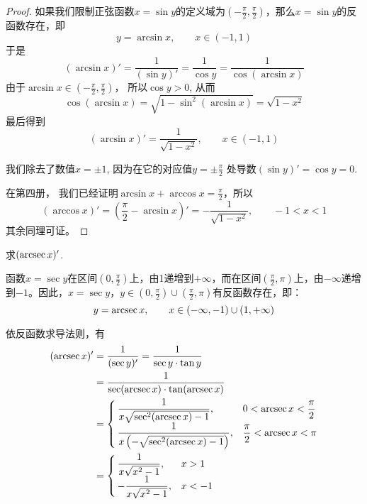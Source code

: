 \begin{proof}
如果我们限制正弦函数$x=\sin y$的定义域为$\left(-\frac{\pi}{2},\frac{\pi}{2}\right)$，那么$x=\sin y$的反函数存在，即
\[    y=\arcsin x,\qquad x\in (-1, 1)\]
于是
\[    (\arcsin x)'=\frac{1}{(\sin y)'}=\frac{1}{\cos y}=\frac{1}{\cos(\arcsin x)}\]
由于$\arcsin x\in \left(-\frac{\pi}{2},\frac{\pi}{2}\right)$，
所以$\cos y>0$, 从而
\[    \cos (\arcsin x) =\sqrt{1-\sin^2 (\arcsin x)} =\sqrt{1-x^2}\]
    最后得到
\[  (\arcsin x)'=\frac{1}{\sqrt{1-x^2}},\qquad x\in (-1, 1) \]

我们除去了数值$x=\pm 1$, 因为在它的对应值$y=\pm\frac{\pi}{2}$
处导数$(\sin y)'=\cos y=0$.

在第四册， 我们已经证明$\arcsin x+\arccos x=\frac{\pi}{2}$，所以
\[(\arccos x)'=\left(\frac{\pi}{2}-\arcsin x\right)'=-\frac{1}{\sqrt{1-x^2}},\qquad -1<x<1\]
其余同理可证。
\end{proof}

\begin{example}
求$(\arcsec x)'$.
\end{example}


\begin{solution}
函数$x=\sec y$在区间$\left(0,\frac{\pi}{2}\right)$上，由1递增到$+\infty$，而在区间$\left(\frac{\pi}{2},\pi\right)$上，由$-\infty$递增到$-1$。因此，$x=\sec y$，$y\in\left(0,\frac{\pi}{2}\right)\cup \left(\frac{\pi}{2},\pi\right)$有反函数存在，即：
\[y=\arcsec x,\qquad x\in (-\infty,-1)\cup(1,+\infty)\]

依反函数求导法则，有
\[\begin{split}
    (\arcsec x)'&=\frac{1}{(\sec y)'}=\frac{1}{\sec y\cdot \tan y}\\
    &=\frac{1}{\sec(\arcsec x)\cdot \tan(\arcsec x)}\\
    &=\begin{cases}
        \frac{1}{x\sqrt{\sec^2(\arcsec x)-1}}, & 0<\arcsec x<\frac{\pi}{2}\\
        \frac{1}{x\left(-\sqrt{\sec^2(\arcsec x)-1}\right)}, & \frac{\pi}{2}<\arcsec x<\pi \\
    \end{cases}\\
    &=\begin{cases}
        \frac{1}{x\sqrt{x^2-1}}, & x>1\\
       - \frac{1}{x\sqrt{x^2-1}}, & x<-1
    \end{cases}
\end{split}\]
\end{solution}


